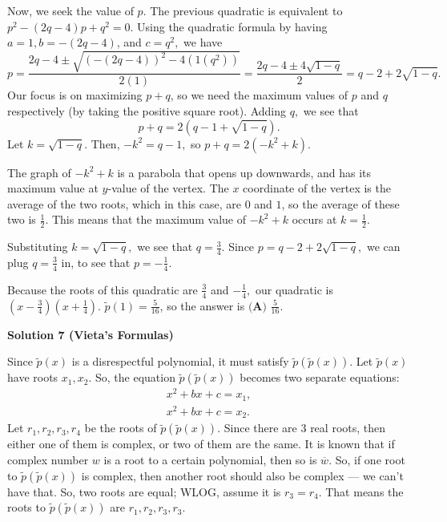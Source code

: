 \begin{enumerate}
 
Now, we seek the value of $p$. The previous quadratic is equivalent to $p^2-(2q-4)p+q^2=0$. Using the quadratic formula by having $a=1, b=-(2q-4)$, and $c=q^2,$ we have
 \[p = \frac{2q-4\pm\sqrt{(-(2q-4))^2-4(1(q^2))}}{2(1)} = \frac{2q-4\pm4\sqrt{1-q}}{2}=q-2+2\sqrt{1-q}.\]Our focus is on maximizing $p+q$, so we need the maximum values of $p$ and $q$ respectively (by taking the positive square root). Adding $q,$ we see that
 \[p+q=2\left(q-1+\sqrt{1-q}\right).\]Let $k=\sqrt{1-q}.$ Then, $-k^2=q-1,$ so $p+q=2(-k^2+k).$ 

 
The graph of $-k^2+k$ is a parabola that opens up downwards, and has its maximum value at $y$-value of the vertex. The $x$ coordinate of the vertex is the average of the two roots, which in this case, are $0$ and $1$, so the average of these two is $\frac{1}{2}$. This means that the maximum value of $-k^2+k$ occurs at $k=\frac{1}{2}.$ 

 
Substituting $k=\sqrt{1-q},$ we see that $q=\frac{3}{4}.$ Since $p=q-2+2\sqrt{1-q},$ we can plug $q=\frac{3}{4}$ in, to see that $p=-\frac{1}{4}.$

 
Because the roots of this quadratic are $\frac{3}{4}$ and $-\frac{1}{4},$ our quadratic is $\left(x-\frac{3}{4}\right)\left(x+\frac{1}{4}\right).$ $\tilde{p}(1)=\frac{5}{16}$, so the answer is $\boxed{\textbf{(A) } \frac{5}{16}}$.

 



\textbf{Solution 7 (Vieta’s Formulas)}

Since $\tilde{p}(x)$ is a disrespectful polynomial, it must satisfy $\tilde{p}(\tilde{p}(x))$. Let $\tilde{p}(x)$ have roots $x_1, x_2$. So, the equation $\tilde{p}(\tilde{p}(x))$ becomes two separate equations:
 \begin{align*} x^2+bx+c=x_1, \\ x^2+bx+c=x_2. \end{align*}
Let $r_1,r_2,r_3,r_4$ be the roots of $\tilde{p}(\tilde{p}(x))$. Since there are $3$ real roots, then either one of them is complex, or two of them are the same. It is known that if complex number $w$ is a root to a certain polynomial, then so is $\overline{w}$. So, if one root to $\tilde{p}(\tilde{p}(x))$ is complex, then another root should also be complex — we can't have that. So, two roots are equal; WLOG, assume it is $r_3=r_4$. That means the roots to $\tilde{p}(\tilde{p}(x))$ are $r_1,r_2,r_3,r_3$.


\end{enumerate}
